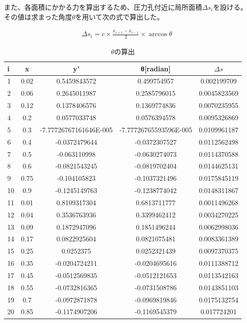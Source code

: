 \documentclass[a4j,twoside,openright,11pt]{jarticle}
\begin{document}
また、各面積にかかる力を算出するため、圧力孔付近に局所面積$\Delta s_i$を設ける。その値は求まった角度$\theta$を用いて次の式で算出した。

\begin{eqnarray}
\Delta s_i = c \times \frac{x_{i+1} - x_{i-1}}{2} \times \arccos \theta
\end{eqnarray}

\begin{table}[htb]
\begin{center}
  \caption{$\theta$の算出}
  \begin{tabular}{|l||c|c|c|c|} \hline
i&x&y'&θ[radian]&$\Delta s$\\\hline
1&0.02&0.5459843572&0.499754957&0.002199709\\
2&0.06&0.2645011987&0.2585796015&0.0045823569\\
3&0.12&0.1378406576&0.1369774836&0.0070235955\\
4&0.2&0.0577033748&0.0576394578&0.0095326869\\
5&0.3&-7.77726767161646E-005&-7.77726765593596E-005&0.0109961187\\
6&0.4&-0.0372479644&-0.0372307527&0.0112562498\\
7&0.5&-0.063110998&-0.0630274073&0.0114370588\\
8&0.6&-0.0821543245&-0.0819702404&0.0144625131\\
9&0.75&-0.104105823&-0.1037321496&0.0175845119\\
10&0.9&-0.1245149763&-0.1238774042&0.0148311867\\
11&0.01&0.8109317304&0.6813711777&0.0011496268\\
12&0.04&0.3536763936&0.3399462412&0.0034270225\\
13&0.09&0.1872947096&0.1851496244&0.0062998036\\
14&0.17&0.0822925604&0.0821075481&0.0083361389\\
15&0.25&0.0252375&0.0252321439&0.0097370375\\
16&0.35&-0.0204724211&-0.0204695616&0.0111388712\\
17&0.45&-0.0512569835&-0.0512121653&0.0113542163\\
18&0.55&-0.0732816365&-0.0731508786&0.0143851103\\
19&0.7&-0.0972871878&-0.0969819846&0.0175132754\\
20&0.85&-0.1174907206&-0.1169545379&0.017724201\\
\hline
  \end{tabular}
\end{center}
\end{table}
\end{document}
